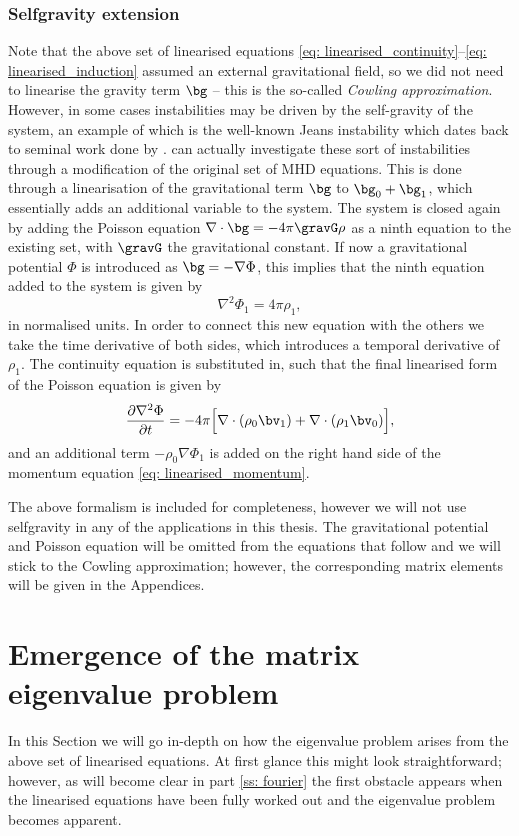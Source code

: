 \subsubsection{Selfgravity extension}
Note that the above set of linearised equations \eqref{eq: linearised_continuity}--\eqref{eq: linearised_induction} assumed an external gravitational field, so we did not need to linearise the gravity term $\bg$ -- this is the so-called \emph{Cowling approximation}. However, in some cases instabilities may be driven by the self-gravity of the system, an example of which is the well-known Jeans instability which dates back to seminal work done by \citet{book_jeans}. {\legolas} can actually investigate these sort of instabilities through a modification of the original set of MHD equations. This is done through a linearisation of the gravitational term $\bg$ to $\bg_0 + \bg_1$, which essentially adds an additional variable to the system. The system is closed again by adding the Poisson equation $\nabla \cdot \bg = -4\pi \gravG \rho$ as a ninth equation to the existing set, with $\gravG$ the gravitational constant. If now a gravitational potential $\Phi$ is introduced as $\bg = -\nabla \Phi$, this implies that the ninth equation added to the system is given by
\begin{equation}
  \nabla^2\Phi_1 = 4\pi\rho_1,
\end{equation}
in normalised units. In order to connect this new equation with the others we take the time derivative of both sides, which introduces a temporal derivative of $\rho_1$. The continuity equation is substituted in, such that the final linearised form of the Poisson equation is given by
\begin{equation}
  \frac{\partial \nabla^2 \Phi}{\partial t} =
    -4\pi \Bigl[\nabla \cdot \left(\rho_0 \bv_1\right) + \nabla \cdot \left(\rho_1 \bv_0\right)\Bigr],
\end{equation}
and an additional term $-\rho_0 \nabla \Phi_1$ is added on the right hand side of the momentum equation \eqref{eq: linearised_momentum}.

The above formalism is included for completeness, however we will not use selfgravity in any of the applications in this thesis. The gravitational potential and Poisson equation will be omitted from the equations that follow and we will stick to the Cowling approximation; however, the corresponding matrix elements will be given in the Appendices.

\section{Emergence of the matrix eigenvalue problem}
In this Section we will go in-depth on how the eigenvalue problem arises from the above set of linearised equations. At first glance this might look straightforward; however, as will become clear in part \ref{ss: fourier} the first obstacle appears when the linearised equations have been fully worked out and the eigenvalue problem becomes apparent.

